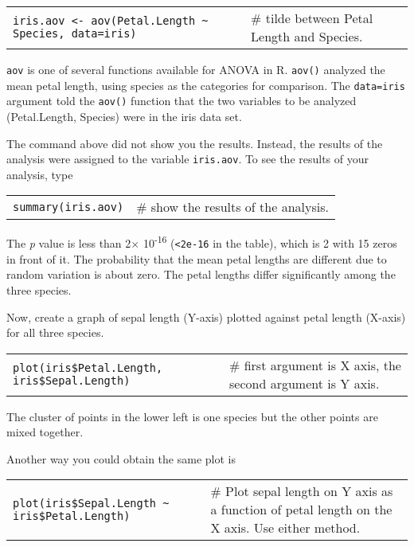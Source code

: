 \documentclass[11pt]{article}
\begin{document}
\begin{tabular}{@{}L{4in}L{1.5in}@{}}
\texttt{iris.aov \textless{}- aov(Petal.Length \textasciitilde{} Species,
data=iris)} &  \# tilde between Petal Length and Species.\\
\end{tabular}

\texttt{aov} is one of several functions available for ANOVA in R. \texttt{aov()} analyzed
the mean petal length, using species as the categories for comparison.
The \texttt{data=iris} argument told the \texttt{aov()} function that the two variables to
be analyzed (Petal.Length, Species) were in the iris data set.

The command above did not show you the results. Instead, the results of
the analysis were assigned to the variable \texttt{iris.aov}. To see the results
of your analysis, type

\begin{tabular}{@{}L{1.5in}L{4in}@{}}
\texttt{summary(iris.aov)} & \# show the results of the analysis. \\
\end{tabular}

The \emph{p} value is less than 2$\times$ 10\textsuperscript{-16}
(\texttt{\textless{}2e-16} in the table), which is 2 with 15 zeros in front of
it. The probability that the mean petal lengths are different due to
random variation is about zero. The petal lengths differ significantly
among the three species.

Now, create a graph of sepal length (Y-axis) plotted against petal
length (X-axis) for all three species.

\begin{tabular}{@{}L{3.5in}L{2.25in}@{}}
\texttt{plot(iris\$Petal.Length, iris\$Sepal.Length)} & \# first argument is X
axis, the second argument is Y axis.\\
\end{tabular}

The cluster of points in the lower left is one species but the other
points are mixed together.

Another way you could obtain the same plot is

\begin{tabular}{@{}L{3.5in}L{2.25in}@{}}
\texttt{plot(iris\$Sepal.Length \textasciitilde{} iris\$Petal.Length)} & \# Plot
sepal length on Y axis as a function of petal length on the X axis. Use either method.\\
\end{tabular}
\end{document}
